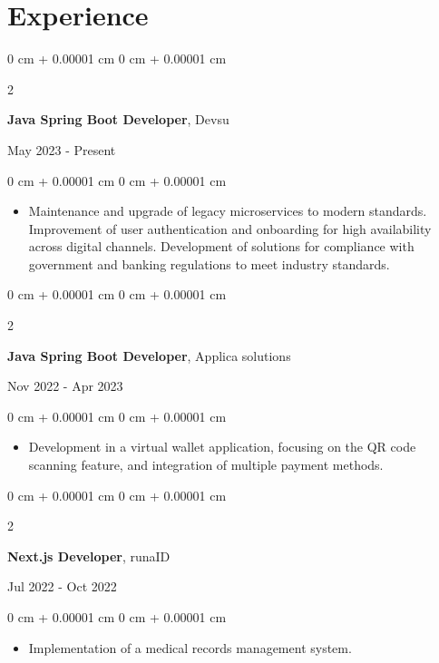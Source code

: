 \documentclass[10pt, letterpaper]{article}
\newenvironment{highlights}{
    \begin{itemize}[
        topsep=0.10 cm,
        parsep=0.10 cm,
        partopsep=0pt,
        itemsep=0pt,
        leftmargin=0 cm + 10pt
    ]
}{
    \end{itemize}
} %
\newenvironment{onecolentry}{
    \begin{adjustwidth}{
        0 cm + 0.00001 cm
    }{
        0 cm + 0.00001 cm
    }
}{
    \end{adjustwidth}
} %
\newenvironment{twocolentry}[2][]{
    \onecolentry
    \def\secondColumn{#2}
    \setcolumnwidth{\fill, 4.5 cm}
    \begin{paracol}{2}
}{
    \switchcolumn \raggedleft \secondColumn
    \end{paracol}
    \endonecolentry
} %
\begin{document}
    \section{Experience}
    \begin{twocolentry}{
        May 2023  - Present
    }
    \textbf{Java Spring Boot Developer}, Devsu
    \end{twocolentry}
    \vspace{0.10 cm}
    \begin{onecolentry}
        \begin{highlights}
            \item Maintenance and upgrade of legacy microservices to modern standards. Improvement of user authentication and onboarding for high availability across digital channels. Development of solutions for compliance with government and banking regulations to meet industry standards.
        \end{highlights}
    \end{onecolentry}  
    \vspace{0.2 cm}  
    \begin{twocolentry}{
            Nov 2022  - Apr 2023
        }
    \textbf{Java Spring Boot Developer}, Applica solutions
    \end{twocolentry}   
    \vspace{0.10 cm}
    \begin{onecolentry}
        \begin{highlights}
            \item Development in a virtual wallet application, focusing on the QR code scanning feature, and integration of multiple payment methods.
        \end{highlights}
    \end{onecolentry}
    \vspace{0.2 cm}
    \begin{twocolentry}{
            Jul 2022  - Oct 2022
        }
        \textbf{Next.js Developer}, runaID
    \end{twocolentry}
    \vspace{0.10 cm}
    \begin{onecolentry}
        \begin{highlights}
            \item Implementation of a medical records management system.
        \end{highlights}
    \end{onecolentry}
    \vspace{0.2 cm}
\end{document}
